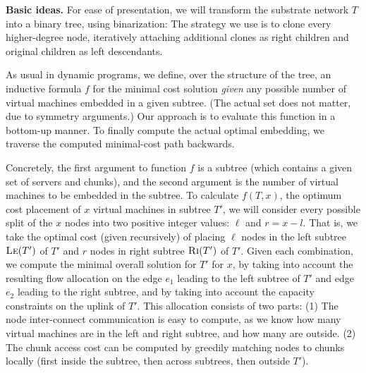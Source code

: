 \documentclass[9pt]{sigcomm-alternate}
\newcommand{\Tree}{\ensuremath{T}}
\begin{document}
\textbf{Basic ideas.} For ease of presentation, we will transform the substrate network $\Tree$
into a binary tree, using binarization:
The
strategy we use is to clone every higher-degree node,
iteratively attaching additional clones as right children 
and original children as left descendants. 

As usual in dynamic programs, we define, over the structure of the tree, an inductive formula $f$ for
the minimal cost solution \emph{given} any possible number of virtual
machines embedded in a given subtree. (The actual set does not matter,
due to symmetry arguments.) 
Our approach is to evaluate this function in a bottom-up
manner.  
To finally compute the actual optimal embedding, 
we traverse the computed minimal-cost path backwards.

Concretely, the first argument to function $f$ 
is a subtree (which contains a given set of servers and chunks), 
and the
second argument is the number of virtual machines to be embedded in the subtree.
To calculate $f(T, x)$, the optimum
cost placement of $x$ virtual machines in subtree $T'$, we will
consider every possible split of the $x$ nodes into two positive integer
values: $\ell$ and $r = x - l$. That is, we take the optimal cost 
(given recursively) of placing $\ell$ nodes in
the left subtree $\textsc{Le}(T')$ of $T'$ and $r$ nodes in right subtree $\textsc{Ri}(T')$ of
$T'$. Given each combination, we compute the minimal overall solution for $T'$
for $x$, by taking into account the resulting flow allocation on the edge $e_{1}$ 
leading to the left subtree of $T'$ and 
edge $e_2$ leading to the right subtree, and by
taking into account the capacity constraints on the uplink of $T'$.
This allocation consists of two parts: (1) The node inter-connect
communication is easy to compute, as we know how many
virtual machines are in the left and right subtree, and how many are 
outside. 
(2) The chunk access cost
can be computed by greedily matching nodes to chunks locally (first
inside the subtree, then across subtrees, then outside $T'$).
\end{document}
